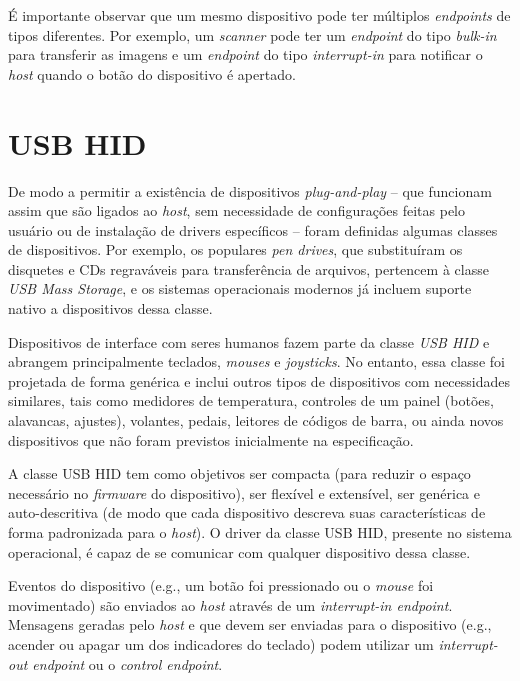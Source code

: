 \documentclass[brazil,pagestart=firstchapter]{abnt}
\makeatletter
\newcommand*{\eg}{e.g.\@\xspace}
\makeatother
\begin{document}
É importante observar que um mesmo dispositivo pode ter múltiplos
\textit{endpoints} de tipos diferentes. Por exemplo, um \textit{scanner}
pode ter um \textit{endpoint} do tipo \textit{bulk-in} para transferir as
imagens e um \textit{endpoint} do tipo \textit{interrupt-in} para notificar
o \textit{host} quando o botão do dispositivo é apertado.


\section{USB HID}
\label{sec:usb_hid}

De modo a permitir a existência de dispositivos \textit{plug-and-play} --
que funcionam assim que são ligados ao \textit{host}, sem necessidade de
configurações feitas pelo usuário ou de instalação de drivers específicos --
foram definidas algumas classes de dispositivos. Por exemplo, os populares
\textit{pen drives}, que substituíram os disquetes e CDs regraváveis para
transferência de arquivos, pertencem à classe \textit{USB Mass Storage}, e
os sistemas operacionais modernos já incluem suporte nativo a dispositivos
dessa classe.

Dispositivos de interface com seres humanos fazem parte da classe
\textit{USB \ac{HID}} e abrangem principalmente teclados, \textit{mouses} e
\textit{joysticks}. No entanto, essa classe foi projetada de forma genérica
e inclui outros tipos de dispositivos com necessidades similares, tais como
medidores de temperatura, controles de um painel (botões, alavancas,
ajustes), volantes, pedais, leitores de códigos de barra, ou ainda novos
dispositivos que não foram previstos inicialmente na especificação.
\cite[p.~1]{usbhid}

A classe \ac{USB} \ac{HID} tem como objetivos ser compacta (para reduzir o
espaço necessário no \textit{firmware} do dispositivo), ser flexível e
extensível, ser genérica e auto-descritiva (de modo que cada dispositivo
descreva suas características de forma padronizada para o \textit{host}). O
driver da classe \ac{USB} \ac{HID}, presente no sistema operacional, é capaz
de se comunicar com qualquer dispositivo dessa classe. \cite[p.~2]{usbhid}

Eventos do dispositivo (\eg, um botão foi pressionado ou o \textit{mouse}
foi movimentado) são enviados ao \textit{host} através de um
\textit{interrupt-in endpoint}. Mensagens geradas pelo \textit{host} e que
devem ser enviadas para o dispositivo (\eg, acender ou apagar um dos
indicadores do teclado) podem utilizar um \textit{interrupt-out endpoint} ou
o \textit{control endpoint}. \cite[p.~10]{usbhid}
\end{document}
